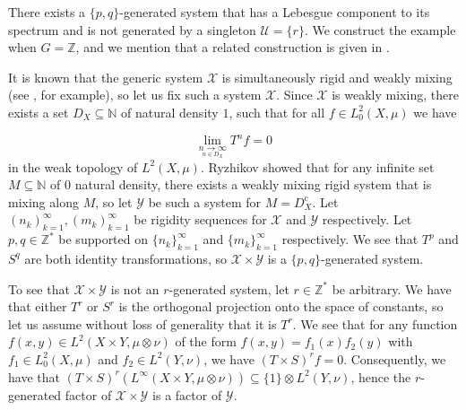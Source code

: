 \documentclass[graybox]{svmult}
\theoremstyle{definition}
\begin{document}
\begin{example}\label{ex:FirstExample}
    There exists a $\{p,q\}$-generated system that has a Lebesgue component to its spectrum and is not generated by a singleton ${\mathcal{U}}=\{r\}$.
    We construct the example when $G = \mathbb{Z}$, and we mention that a related construction is given in \cite[Example 5.5]{MildMixingForLCGroups}.

   
   It is known that the generic system $\mathcal{X}$ is simultaneously rigid and weakly mixing (see \cite[Proposition 2.16]{RigidityAndNonRecurrence}, for example), so let us fix such a system $\mathcal{X}$.
   Since $\mathcal{X}$ is weakly mixing, there exists a set $D_X \subseteq \mathbb{N}$ of natural density $1$, such that for all $f \in L^2_0(X,\mu)$ we have

   \begin{equation}
       \lim_{\underset{n \in D_X}{n\rightarrow\infty}}T^nf = 0
   \end{equation}
   in the weak topology of $L^2(X,\mu)$.
   Ryzhikov \cite{MixingSetsForRigidTransformations} showed that for any infinite set $M \subseteq \mathbb{N}$ of $0$ natural density, there exists a weakly mixing rigid system that is mixing along $M$, so let $\mathcal{Y}$ be such a system for $M = D_X^c$.
   Let $(n_k)_{k = 1}^\infty,(m_k)_{k = 1}^\infty$ be rigidity sequences for $\mathcal{X}$ and $\mathcal{Y}$ respectively.
   Let $p,q \in \mathbb{Z}^*$ be supported on $\{n_k\}_{k = 1}^\infty$ and $\{m_k\}_{k = 1}^\infty$ respectively.
   We see that $T^p$ and $S^q$ are both identity transformations, so $\mathcal{X}\times\mathcal{Y}$ is a $\{p,q\}$-generated system.

   To see that $\mathcal{X}\times\mathcal{Y}$ is not an $r$-generated system, let $r \in \mathbb{Z}^*$ be arbitrary.
   We have that either $T^r$ or $S^r$ is the orthogonal projection onto the space of constants, so let us assume without loss of generality that it is $T^r$.
   We see that for any function $f(x,y) \in L^2(X\times Y,\mu\otimes\nu)$ of the form $f(x,y) = f_1(x)f_2(y)$ with $f_1 \in L^2_0(X,\mu)$ and $f_2 \in L^2(Y,\nu)$, we have $(T\times S)^rf = 0$.
   Consequently, we have that $(T\times S)^r(L^\infty(X\times Y,\mu\otimes\nu)) \subseteq \{1\}\otimes L^2(Y,\nu)$, hence the $r$-generated factor of $\mathcal{X}\times\mathcal{Y}$ is a factor of $\mathcal{Y}$.
\end{example}
\end{document}
